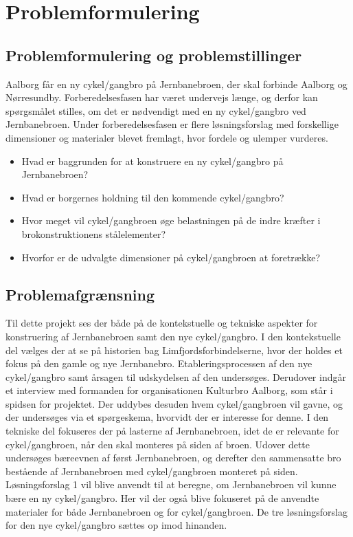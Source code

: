 \chapter{Problemformulering}

\section{Problemformulering og problemstillinger}
Aalborg får en ny cykel/gangbro på Jernbanebroen, der skal forbinde Aalborg og Nørresundby. Forberedelsesfasen har været undervejs længe, og derfor kan spørgsmålet stilles, om det er nødvendigt med en ny cykel/gangbro ved Jernbanebroen. Under forberedelsesfasen er flere løsningsforslag med forskellige dimensioner og materialer blevet fremlagt, hvor fordele og ulemper vurderes.
\begin{itemize} \item Hvad er baggrunden for at konstruere en ny cykel/gangbro på Jernbanebroen? \item Hvad er borgernes holdning til den kommende cykel/gangbro? \item Hvor meget vil cykel/gangbroen øge belastningen på de indre kræfter i brokonstruktionens stålelementer? \item Hvorfor er de udvalgte dimensioner på cykel/gangbroen at foretrække?
\end{itemize} 

\section{Problemafgrænsning}
Til dette projekt ses der både på de kontekstuelle og tekniske aspekter for konstruering af Jernbanebroen samt den nye cykel/gangbro. I den kontekstuelle del vælges der at se på historien bag Limfjordsforbindelserne, hvor der holdes et fokus på den gamle og nye Jernbanebro. Etableringsprocessen af den nye cykel/gangbro samt årsagen til udskydelsen af den undersøges. Derudover indgår et interview med formanden for organisationen Kulturbro Aalborg, som står i spidsen for projektet. Der uddybes desuden hvem cykel/gangbroen vil gavne, og der undersøges via et spørgeskema, hvorvidt der er interesse for denne.
\newline \indent{     }  I den tekniske del fokuseres der på lasterne af Jernbanebroen, idet de er relevante for cykel/gangbroen, når den skal monteres på siden af broen. Udover dette undersøges bæreevnen af først Jernbanebroen, og derefter den sammensatte bro bestående af Jernbanebroen med cykel/gangbroen monteret på siden. Løsningsforslag 1 vil blive anvendt til at beregne, om Jernbanebroen vil kunne bære en ny cykel/gangbro. Her vil der også blive fokuseret på de anvendte materialer for både Jernbanebroen og for cykel/gangbroen. De tre løsningsforslag for den nye cykel/gangbro sættes op imod hinanden. 